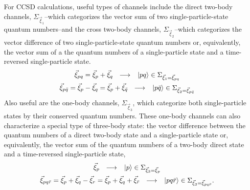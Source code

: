 \documentclass[thesis.tex]{subfiles}
\begin{document}
For CCSD calculations, useful types of channels include the direct two-body channels, $\Sigma_{\vec{\xi}_{1}}$--which categorizes the vector sum of two single-particle-state quantum numbers--and the cross two-body channels, $\Sigma_{\vec{\xi}_{2}}$--which categorizes the vector difference of two single-particle-state quantum numbers or, equivalently, the vector sum of a the quantum numbers of a single-particle state and a time-reversed single-particle state.
\begin{gather}
  \vec{\xi}_{pq} = \vec{\xi}_{p} + \vec{\xi}_{q}\ \ \longrightarrow\ \ \ket{pq} \in \Sigma_{\vec{\xi}_{1}=\vec{\xi}_{pq}} \\
  \vec{\xi}_{p\bar{q}} = \vec{\xi}_{p} - \vec{\xi}_{q} = \vec{\xi}_{p} + \vec{\xi}_{\bar{q}}\ \ \longrightarrow\ \ \ket{p\bar{q}} \in \Sigma_{\vec{\xi}_{2}=\vec{\xi}_{p\bar{q}}}
\end{gather}
Also useful are the one-body channels, $\Sigma_{\vec{\xi}_{3}}$, which categorize both single-particle states by their conserved quantum numbers.  These one-body channels can also characterize a special type of three-body state: the vector difference between the quantum numbers of a direct two-body state and a single-particle state or, equivalently, the vector sum of the quantum numbers of a two-body direct state and a time-reversed single-particle state,
\begin{gather}
  \vec{\xi}_{p}\ \ \longrightarrow\ \ \ket{p} \in \Sigma_{\vec{\xi}_{3}=\vec{\xi}_{p}} \\
  \vec{\xi}_{pq\bar{r}} = \vec{\xi}_{p} + \vec{\xi}_{q} - \vec{\xi}_{r} = \vec{\xi}_{p} + \vec{\xi}_{q} + \vec{\xi}_{\bar{r}}\ \ \longrightarrow\ \ \ket{pq\bar{r}} \in \Sigma_{\vec{\xi}_{3}=\vec{\xi}_{pq\bar{r}}}.
\end{gather}
\end{document}

